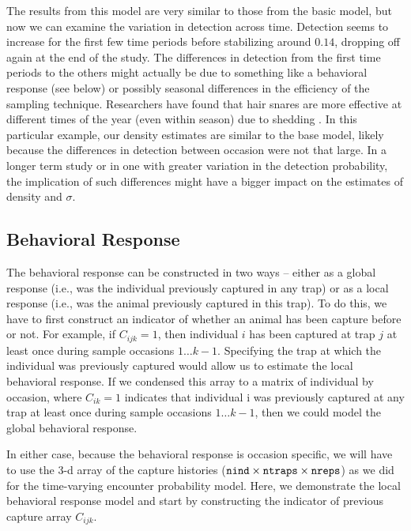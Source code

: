 The results from this model are very similar to those from the basic
model, but now we can examine the variation in detection across time.
Detection seems to
increase for the first few time periods before stabilizing around $0.14$, dropping off again at the end of the study.
The differences in detection from the first time periods to the others might
actually be due to something like a behavioral response (see below) or possibly seasonal
differences in the efficiency of the sampling technique.
Researchers have found that hair snares are more effective at different
times of the year (even within season) due to shedding \citep{wegan_etal:inpress}.
In this particular example, our density estimates are
similar to the base model, likely because the differences in detection between occasion were not that large.
In a longer term study or in one with greater variation in the detection probability,
the implication of such differences might have a bigger impact on the estimates of density
and $\sigma$.

\subsection{Behavioral Response}

The behavioral response can be constructed in two ways -- either as a
global response (i.e., was the individual previously captured in any trap) or
as a local response (i.e., was the animal previously captured in this
trap).  To do this, we have to first
construct an indicator of whether an animal has been capture before or not.  For
example, if $C_{ijk} = 1$, then individual $i$ has been captured at trap $j$
 at least once during
sample occasions $1 \dots k-1$.  Specifying the trap at which the individual was
previously captured would allow us to estimate the local behavioral response.  If
we condensed this array to a matrix of individual by occasion, where $C_{ik} = 1$ indicates
that individual i was previously captured at any trap at least once during
sample occasions $1 \dots k-1$, then we
could model the global behavioral response.

In either case, because the behavioral response is occasion specific, we will have to use the 3-d array of the
capture histories ($\mbox{\tt nind} \times \mbox{\tt ntraps} \times
\mbox{\tt nreps}$) as we did for the time-varying encounter probability
model.
Here, we demonstrate the local behavioral response model and start by constructing the
indicator of previous capture array $C_{ijk}$.

